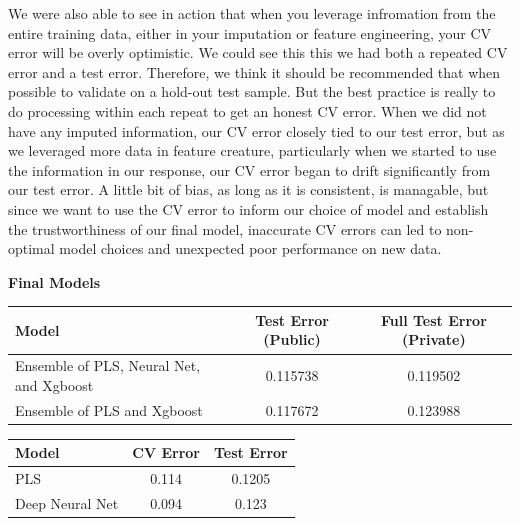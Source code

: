 \documentclass[12pt]{article}
\begin{document}
We were also able to see in action that when you leverage infromation from the entire training data, either in your imputation or feature engineering, your CV error will be overly optimistic.  We could see this this we had both a repeated CV error and a test error.  Therefore, we think it should be recommended that when possible to validate on a hold-out test sample.  But the best practice is really to do processing within each repeat to get an honest CV error.  When we did not have any imputed information, our CV error closely tied to our test error, but as we leveraged more data in feature creature, particularly when we started to use the information in our response, our CV error began to drift significantly from our test error.  A little bit of bias, as long as it is consistent, is managable, but since we want to use the CV error to inform our choice of model and establish the trustworthiness of our final model, inaccurate CV errors can led to non-optimal model choices and unexpected poor performance on new data.

\textbf{Final Models}
\begin{center}
\begin{tabular}{l c c}
	\hline
	Model & Test Error (Public) & Full Test Error (Private) \\
	\hline
	Ensemble of PLS, Neural Net, and Xgboost & 0.115738 & 0.119502 \\
	Ensemble of PLS and Xgboost & 0.117672 & 0.123988 \\
	\hline
\end{tabular}
\end{center}

\begin{center}
\begin{tabular}{l c c}
	\hline
	Model & CV Error & Test Error\\
	\hline
	PLS & 0.114 & 0.1205 \\
	Deep Neural Net & 0.094 & 0.123 \\
	\hline
\end{tabular}
\end{center}
\end{document}
